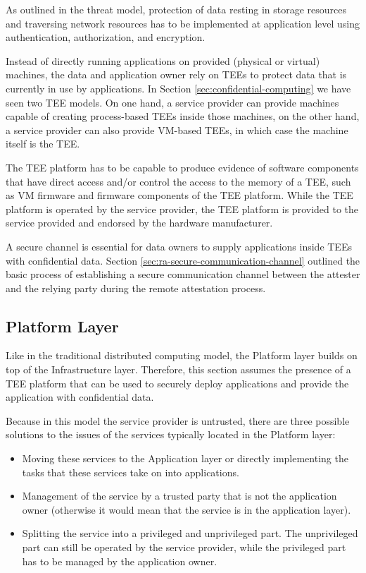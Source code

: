 As outlined in the threat model, protection of data resting in storage resources
and traversing network resources has to be implemented at application level
using authentication, authorization, and encryption.

Instead of directly running applications on provided (physical or virtual)
machines, the data and application owner rely on TEEs to protect data that is
currently in use by applications. In Section \ref{sec:confidential-computing} we
have seen two TEE models. On one hand, a service provider can provide machines
capable of creating process-based TEEs inside those machines, on the other hand,
a service provider can also provide VM-based TEEs, in which case the machine
itself is the TEE.

The TEE platform has to be capable to produce evidence of software components
that have direct access and/or control the access to the memory of a TEE, such
as VM firmware and firmware components of the TEE platform. While the TEE
platform is operated by the service provider, the TEE platform is provided to
the service provided and endorsed by the hardware manufacturer.

A secure channel is essential for data owners to supply applications inside TEEs
with confidential data. Section \ref{sec:ra-secure-communication-channel}
outlined the basic process of establishing a secure communication channel
between the attester and the relying party during the remote attestation
process.

\subsection{Platform Layer}

Like in the traditional distributed computing model, the Platform layer builds
on top of the Infrastructure layer. Therefore, this section assumes the presence
of a TEE platform that can be used to securely deploy applications and provide
the application with confidential data.

Because in this model the service provider is untrusted, there are three
possible solutions to the issues of the services typically located in the
Platform layer:

\begin{itemize}
  \item Moving these services to the Application layer or directly implementing
        the tasks that these services take on into applications.
  \item Management of the service by a trusted party that is not the application
        owner (otherwise it would mean that the service is in the application
        layer).
  \item Splitting the service into a privileged and unprivileged part. The
        unprivileged part can still be operated by the service provider, while
        the privileged part has to be managed by the application owner.
\end{itemize}

